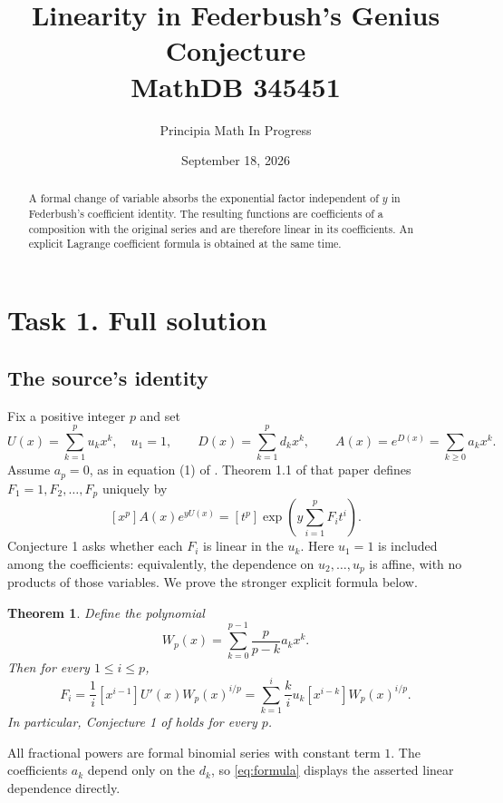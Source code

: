 \documentclass[11pt]{article}
\title{Linearity in Federbush's Genius Conjecture\\\large MathDB 345451}
\author{Principia Math In Progress}
\date{September 18, 2026}
\newtheorem{theorem}{Theorem}
\begin{document}
\maketitle
\begin{abstract}
A formal change of variable absorbs the exponential factor independent
of $y$ in Federbush's coefficient identity. The resulting functions are
coefficients of a composition with the original series and are therefore
linear in its coefficients. An explicit Lagrange coefficient formula
is obtained at the same time.
\end{abstract}

\section*{Task 1. Full solution}
\subsection*{The source's identity}
Fix a positive integer $p$ and set
\[
 U(x)=\sum_{k=1}^p u_kx^k,\quad u_1=1,\qquad
 D(x)=\sum_{k=1}^p d_kx^k,\qquad
 A(x)=e^{D(x)}=\sum_{k\ge0}a_kx^k.
\]
Assume $a_p=0$, as in equation (1) of \cite{fed}. Theorem 1.1 of
that paper defines $F_1=1,F_2,\ldots,F_p$ uniquely by
\begin{equation}\label{eq:target}
 [x^p]A(x)e^{yU(x)}
       =[t^p]\exp\left(y\sum_{i=1}^pF_it^i\right).
\end{equation}
Conjecture 1 asks whether each $F_i$ is linear in the $u_k$.
Here $u_1=1$ is included among the coefficients: equivalently, the
dependence on $u_2,\ldots,u_p$ is affine, with no products of those
variables. We prove the stronger explicit formula below.

\begin{theorem}\label{thm:main}
Define the polynomial
\begin{equation}\label{eq:W}
 W_p(x)=\sum_{k=0}^{p-1}\frac{p}{p-k}a_kx^k.
\end{equation}
Then for every $1\le i\le p$,
\begin{equation}\label{eq:formula}
 \boxed{\quad F_i=\frac1i[x^{i-1}]U'(x)W_p(x)^{i/p}
       =\sum_{k=1}^i\frac{k}{i}u_k
                   [x^{i-k}]W_p(x)^{i/p}.\quad}
\end{equation}
In particular, Conjecture 1 of \cite{fed} holds for every $p$.
\end{theorem}
All fractional powers are formal binomial series with constant term
$1$. The coefficients $a_k$ depend only on the $d_k$, so
\eqref{eq:formula} displays the asserted linear dependence directly.
\end{document}
